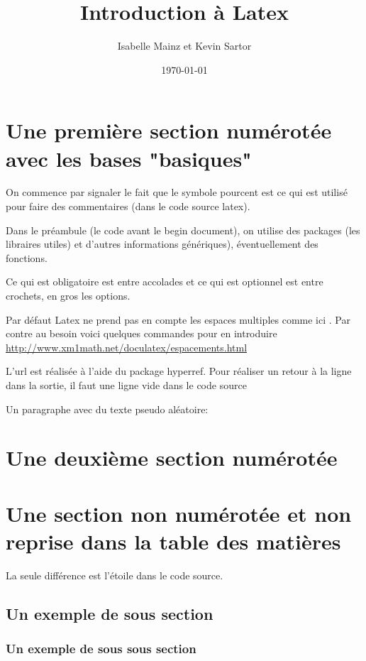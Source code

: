 \documentclass[a4paper,11pt]{article}
\title{Introduction à Latex}	%
\author{Isabelle Mainz et Kevin Sartor}
\date{\today}						%
\begin{document}
\maketitle							%
\tableofcontents					%
\newpage							%

\section{Une première section numérotée avec les bases "basiques"}
On commence par signaler le fait que le symbole pourcent est ce qui est utilisé pour faire des commentaires (dans le code source latex).

Dans le préambule (le code avant le begin document), on utilise des packages (les libraires utiles) et d'autres informations génériques), éventuellement des fonctions.

Ce qui est obligatoire est entre accolades et ce qui est optionnel est entre crochets, en gros les options.

Par défaut Latex ne prend pas en compte les espaces multiples comme ici        . Par contre au besoin voici quelques commandes pour en introduire \url{http://www.xm1math.net/doculatex/espacements.html}

L'url est réalisée à l'aide du package hyperref. Pour réaliser un retour à la ligne dans la sortie, il faut une ligne vide dans le code source

Un paragraphe avec du texte pseudo aléatoire: \blindtext 		%
\section{Une deuxième section numérotée}
\section*{Une section non numérotée et non reprise dans la table des matières} %
La seule différence est l'étoile dans le code source.
\subsection{Un exemple de sous section}
\subsubsection{Un exemple de sous sous section}
\end{document}
